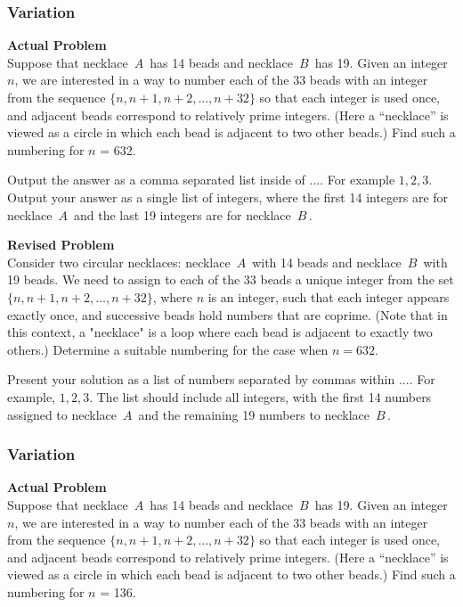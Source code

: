 \subsubsection{Variation}
\textbf{Actual Problem}\\
Suppose that necklace $\, A \,$ has 14 beads and necklace $\, B \,$ has 19. 
Given an integer $n$, we are interested in a way to number each of the 33 beads with an integer from the sequence $\{ n, n+1, n+2, \dots, n+32 \}$ so that each integer is used once, and adjacent beads correspond to relatively prime integers. (Here a ``necklace'' is viewed as a circle in which each bead is adjacent to two other beads.) Find such a numbering for $n$ = 632.

Output the answer as a comma separated list inside of $\boxed{...}$. For example $\boxed{1, 2, 3}$.
Output your answer as a single list of integers, where the first 14 integers are for necklace $\, A \,$ and the last 19 integers are for necklace $\, B \,$.

\textbf{Revised Problem}\\
Consider two circular necklaces: necklace $\, A \,$ with 14 beads and necklace $\, B \,$ with 19 beads. We need to assign to each of the 33 beads a unique integer from the set $\{ n, n+1, n+2, \ldots, n+32 \}$, where $n$ is an integer, such that each integer appears exactly once, and successive beads hold numbers that are coprime. (Note that in this context, a "necklace" is a loop where each bead is adjacent to exactly two others.) Determine a suitable numbering for the case when $n = 632$.

Present your solution as a list of numbers separated by commas within $\boxed{...}$. For example, $\boxed{1, 2, 3}$. The list should include all integers, with the first 14 numbers assigned to necklace $\, A \,$ and the remaining 19 numbers to necklace $\, B \,$.

\subsubsection{Variation}
\textbf{Actual Problem}\\
Suppose that necklace $\, A \,$ has 14 beads and necklace $\, B \,$ has 19. 
Given an integer $n$, we are interested in a way to number each of the 33 beads with an integer from the sequence $\{ n, n+1, n+2, \dots, n+32 \}$ so that each integer is used once, and adjacent beads correspond to relatively prime integers. (Here a ``necklace'' is viewed as a circle in which each bead is adjacent to two other beads.) Find such a numbering for $n$ = 136.


